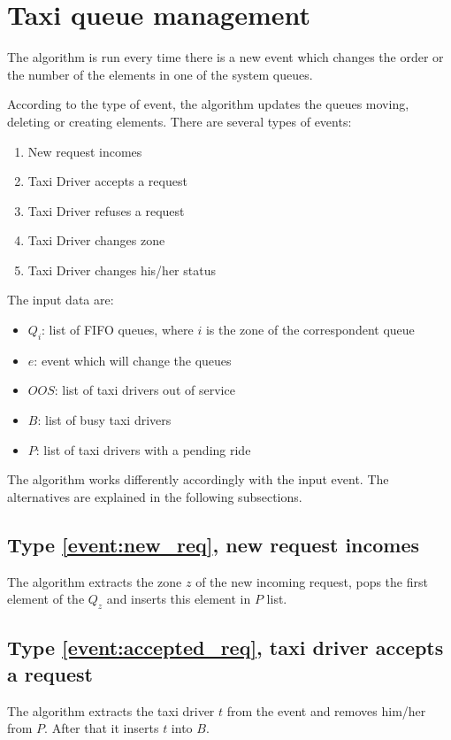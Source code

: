 \section{Taxi queue management}
The algorithm is run every time there is a new event which changes the order or the number of the elements in one of the system queues.

According to the type of event, the algorithm updates the queues moving, deleting or creating elements. There are several types of events:
\begin{enumerate}
	\item New request incomes \label{event:new_req}
	\item Taxi Driver accepts a request \label{event:accepted_req}
	\item Taxi Driver refuses a request \label{event:refuses_req}
	\item Taxi Driver changes zone \label{event:changed_zone}
	\item Taxi Driver changes his/her status \label{event:changed_status}
\end{enumerate}
The input data are:
\begin{itemize}
	\item $Q_i$: list of FIFO queues, where $i$ is the zone of the correspondent queue 
	\item $e$: event which will change the queues
	\item $OOS$: list of taxi drivers out of service
	\item $B$: list of busy taxi drivers
	\item $P$: list of taxi drivers with a pending ride
\end{itemize}  

The algorithm works differently accordingly with the input event. The alternatives are explained in the following subsections.

\subsection{Type \ref{event:new_req}, new request incomes}
The algorithm extracts the zone $z$ of the new incoming request, pops the first element of the $Q_z$ and inserts this element in $P$ list.

\subsection{Type \ref{event:accepted_req}, taxi driver accepts a request}
The algorithm extracts the taxi driver $t$ from the event and removes him/her from $P$. After that it inserts $t$ into $B$.

